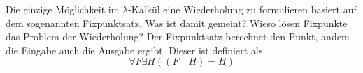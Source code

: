 \begin{card}
  Die einzige Möglichkeit im $\lambda$-Kalkül eine Wiederholung zu formulieren basiert auf dem sogenannten Fixpunktsatz. Was ist damit gemeint? Wieso lösen Fixpunkte das Problem der Wiederholung?
  \hr
  Der Fixpunktsatz berechnet den Punkt, andem die Eingabe auch die Ausgabe ergibt. Dieser ist definiert als
  \[
    \forall F \exists H ((F \quad H) = H)
  \]
\end{card}
